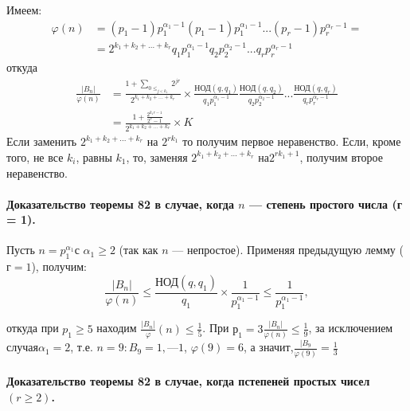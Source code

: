 	\pagebreak
	\noindent
	\begin{myproof}
		Имеем:
		\begin{equation}
		\begin{split}
		\varphi(n) & = (p_1-1)p_{1}^{\alpha_1-1}(p_1-1)p_{1}^{\alpha_1-1}... (p_r-1)p_{r}^{\alpha_r-1} = \\ & = 2^{k_1+k_2+...+k_r}q_1p_{1}^{\alpha_1-1}q_2p_{2}^{\alpha_2-1}...q_rp_{r}^{\alpha_r-1} 
		\end{split}
		\end{equation}
		откуда
		\begin{equation}
		\begin{split}
		\frac{|B_n|}{\varphi(n)} & = \frac{1+ \sum_{0\leqslant_{j <k_1}} 2^{jr}}{2^{k_1+k_2+...+k_r}} \times \frac{\text{НОД}(q,q_1)}{q_1p_{1}^{\alpha_1-1}}\frac{\text{НОД}(q,q_2)}{q_2p_{2}^{\alpha_2-1}}...\frac{\text{НОД}(q,q_r)}{q_rp_{r}^{\alpha_r-1}} \\ & = \frac{1+\frac{2^{k_1r-1}}{2^r-1}}{2^{k_1+k_2+...+k_r}} \times K		
		\end{split}
		\end{equation}
		Если заменить $2^{k_1+k_2+...+k_r}$ на $2^{rk_1}$ то получим первое неравенство.
		Если, кроме того, не все $k_i$, равны $k_1$, то, заменяя $2^{k_1+k_2+...+k_r}$ на$2^{rk_1+1}$, получим второе неравенство.		
	\end{myproof}	

	\paragraph{Доказательство теоремы 82 в случае, когда $n$ — степень простого числа (г = 1).}
	
	
	Пусть $n = p_{1}^{\alpha_1}$с $\alpha_1 \geqslant 2$ (так как $n$ — непростое). Применяя предыдущую лемму ($г = 1$), получим:
	\begin{equation}
	\frac{|B_n|}{\varphi(n)} \leqslant \frac{\text{НОД}(q,q_1)}{q_1} \times \frac{1}{p_{1}^{\alpha_1-1}} \leqslant \frac{1}{p_{1}^{\alpha_1-1}},
	\end{equation}

	откуда при $p_1\geqslant 5$ находим $\frac{|B_n|}{\varphi}(n) \leqslant \frac{1}{5}$. При $р_1= 3 \frac{|B_n|}{\varphi(n)} \leqslant \frac{1}{9}$, за ис­ключением случая$\alpha_1= 2$, т.е. $n = 9: B_9	= {1, — 1}$, $\varphi(9) = 6$, а значит,$\frac{|B_9}{\varphi(9)} = \frac{1}{3}$
	
	\paragraph{Доказательство теоремы 82 в случае, когда пстепеней простых чисел $(r \geqslant 2)$.}
	

